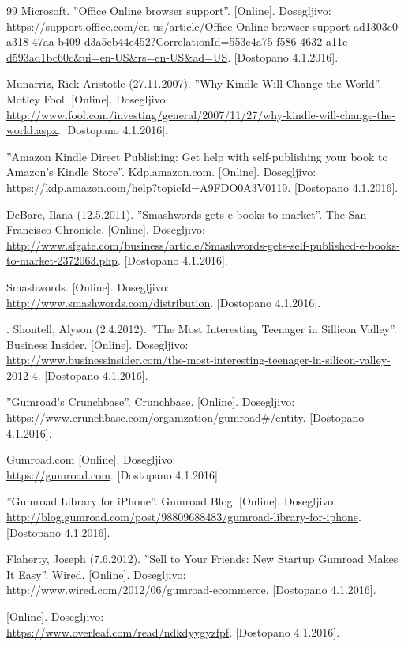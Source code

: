 \documentclass[a4paper, 12pt]{book}
\begin{document}
\begin{thebibliography}{99}
Microsoft. ''Office Online browser support''.
[Online]. Dosegljivo:\\
\url{https://support.office.com/en-us/article/Office-Online-browser-support-ad1303e0-a318-47aa-b409-d3a5eb44e452?CorrelationId=553e4a75-f586-4632-a11c-d593ad1bc60c\&ui=en-US\&rs=en-US\&ad=US}.
[Dostopano 4.1.2016].

 Munarriz, Rick Aristotle (27.11.2007). ''Why Kindle Will Change the World''. Motley Fool.
[Online]. Dosegljivo:\\ \url{http://www.fool.com/investing/general/2007/11/27/why-kindle-will-change-the-world.aspx}.
[Dostopano 4.1.2016].

 ''Amazon Kindle Direct Publishing: Get help with self-publishing your book to Amazon's Kindle Store''. Kdp.amazon.com.
[Online]. Dosegljivo:\\ 
\url{https://kdp.amazon.com/help?topicId=A9FDO0A3V0119}.
[Dostopano 4.1.2016].


 DeBare, Ilana (12.5.2011). ''Smashwords gets e-books to market''. The San Francisco Chronicle.
[Online]. Dosegljivo:\\ \url{http://www.sfgate.com/business/article/Smashwords-gets-self-published-e-books-to-market-2372063.php}.
[Dostopano 4.1.2016].

Smashwords.
[Online]. Dosegljivo:\\
\url{http://www.smashwords.com/distribution}.
[Dostopano 4.1.2016].


. Shontell, Alyson (2.4.2012). ''The Most Interesting Teenager in Sillicon Valley''. Business Insider.
[Online]. Dosegljivo:\\ \url{http://www.businessinsider.com/the-most-interesting-teenager-in-silicon-valley-2012-4}.
[Dostopano 4.1.2016].

 ''Gumroad’s Crunchbase''. Crunchbase.
[Online]. Dosegljivo:\\ 
\url{https://www.crunchbase.com/organization/gumroad\#/entity}.
[Dostopano 4.1.2016].

 Gumroad.com 
[Online]. Dosegljivo:\\ 
\url{https://gumroad.com}.
[Dostopano 4.1.2016].


 ''Gumroad Library for iPhone''. Gumroad Blog.
[Online]. Dosegljivo:\\ 
\url{http://blog.gumroad.com/post/98809688483/gumroad-library-for-iphone}.
[Dostopano 4.1.2016].

 Flaherty, Joseph (7.6.2012). ''Sell to Your Friends: New Startup Gumroad Makes It Easy''. Wired. 
[Online]. Dosegljivo:\\ 
\url{http://www.wired.com/2012/06/gumroad-ecommerce}.
[Dostopano 4.1.2016].

[Online]. Dosegljivo:\\
\url{https://www.overleaf.com/read/ndkdyygyzfpf}.
[Dostopano 4.1.2016].

\end{thebibliography}
\end{document}
